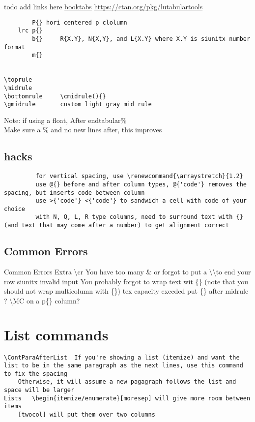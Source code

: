 \documentclass[compact]{corpboreport}
\begin{document}
todo add links here
\url{booktabs}
\url{https://ctan.org/pkg/lutabulartools}

\begin{lstlisting}
		P{} hori centered p clolumn
	lrc	p{}
		b{}		R{X.Y}, N{X,Y}, and L{X.Y} where X.Y is siunitx number format
		m{}


\toprule
\midrule
\bottomrule		\cmidrule(){}
\gmidrule		custom light gray mid rule

\end{lstlisting}

Note: if using a float,
After end{tabular}\%\\
Make sure a \% and no new lines after, this improves

\subsection{hacks}
\begin{lstlisting}
		 for vertical spacing, use \renewcommand{\arraystretch}{1.2}
		 use @{} before and after column types, @{'code'} removes the spacing, but inserts code between column
		 use >{'code'} <{'code'} to sandwich a cell with code of your choice
		 with N, Q, L, R type columns, need to surround text with {} (and text that may come after a number) to get alignment correct
\end{lstlisting}


\subsection{Common Errors}
Common Errors
	Extra \textbackslash cr	You have too many \& or forgot to put a \textbackslash\textbackslash to end your row
	siunitx invalid input	You probably forgot to wrap text wit \{\}  (note that you should not wrap multicolumn with \{\})
	tex capacity exeeded	put \{\} after midrule ?
	\textbackslash MC on a p\{\} column?


\section{List commands}

\begin{lstlisting}
\ContParaAfterList	If you're showing a list (itemize) and want the list to be in the same paragraph as the next lines, use this command to fix the spacing
	Otherwise, it will assume a new pagagraph follows the list and space will be larger
Lists	\begin{itemize/enumerate}[moresep] will give more room between items
	[twocol] will put them over two columns
\end{lstlisting}
\end{document}
